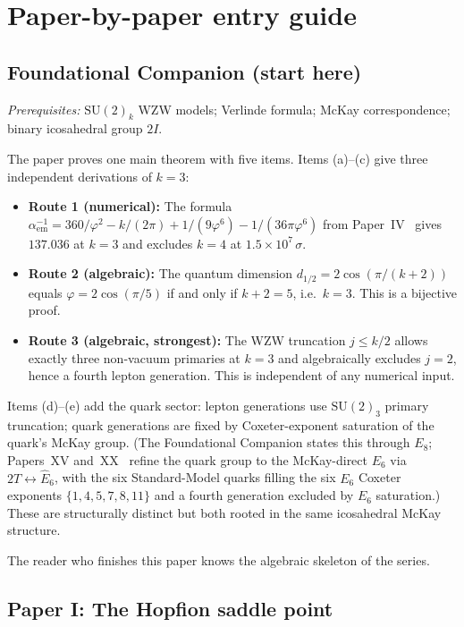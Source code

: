 \documentclass[11pt,a4paper]{article}
\newcommand{\vp}{\varphi}
\newcommand{\aem}{\alpha_{\mathrm{em}}}
\newcommand{\twoI}{2I}
\begin{document}
\section{Paper-by-paper entry guide}

\subsection{Foundational Companion (start here)}

\textit{Prerequisites:} $\mathrm{SU}(2)_k$ WZW models; Verlinde formula;
McKay correspondence; binary icosahedral group $\twoI$.

The paper proves one main theorem with five items. Items (a)--(c) give three
independent derivations of $k=3$:
\begin{itemize}[noitemsep]
\item \textbf{Route 1 (numerical):} The formula
  $\aem^{-1} = 360/\vp^2 - k/(2\pi) + 1/(9\vp^6) - 1/(36\pi\vp^6)$ from Paper~IV~\cite{Paper4}
  gives $137.036$ at $k=3$ and excludes $k=4$ at $1.5\times10^7\,\sigma$.
\item \textbf{Route 2 (algebraic):} The quantum dimension $d_{1/2} = 2\cos(\pi/(k+2))$
  equals $\vp = 2\cos(\pi/5)$ if and only if $k+2=5$, i.e.\ $k=3$.
  This is a bijective proof.
\item \textbf{Route 3 (algebraic, strongest):} The WZW truncation
  $j \leq k/2$ allows exactly three non-vacuum primaries at $k=3$
  and algebraically excludes $j=2$, hence a fourth lepton generation.
  This is independent of any numerical input.
\end{itemize}
Items (d)--(e) add the quark sector: lepton generations use $\mathrm{SU}(2)_3$
primary truncation; quark generations are fixed by Coxeter-exponent saturation
of the quark's McKay group. (The Foundational Companion states this through
$E_8$; Papers~XV and~XX~\cite{Paper15,Paper20} refine the quark group to the
McKay-direct $E_6$ via $2T\leftrightarrow\hat{E}_6$, with the six Standard-Model
quarks filling the six $E_6$ Coxeter exponents $\{1,4,5,7,8,11\}$ and a fourth
generation excluded by $E_6$ saturation.) These are structurally distinct but
both rooted in the same icosahedral McKay structure.

The reader who finishes this paper knows the algebraic skeleton of the series.

\subsection{Paper I: The Hopfion saddle point}
\end{document}

